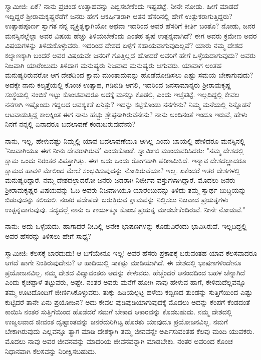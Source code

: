 ಸ್ವಾಮೀಜಿ: ಏಕೆ? ನಾನು ಪ್ರಚಂಡ ಉತ್ಸಾಹವನ್ನು ಎಬ್ಬಿಸಬೇಕೆಂದು ಇಷ್ಟಪಟ್ಟೆ. ನೀನೇ ನೋಡು. ಹೀಗೆ ಮಾಡದೆ ಇದ್ದಿದ್ದರೆ ಶ‍್ರೀರಾಮಕೃಷ್ಣರೆಡೆಗೆ ಜನರು ಹೇಗೆ ಆಕರ್ಷಿತರಾಗಿ ಆತನ ಹೆಸರಿನಲ್ಲಿ ಹೇಗೆ ಉತ್ಸುಕರಾಗುತ್ತಿದ್ದರು? ಉತ್ಸಾಹಪೂರ್ಣ ಸ್ವಾಗತ ನನ್ನ ವ್ಯಕ್ತಿತ್ವಕ್ಕಾಗಿಯೋ ಅಥವಾ ಇದರಿಂದ ಅವರ ಹೆಸರಿಗೆ ಕೀರ್ತಿ ಬಂತೊ? ನೋಡು, ಜನರ ಮನಸ್ಸಿನಲ್ಲೆಲ್ಲಾ ಅವರ ವಿಷಯ ಹೆಚ್ಚು ತಿಳಿಯಬೇಕೆಂದು ಎಂತಹ ತೃಷೆ ಉತ್ಪನ್ನವಾಗಿದೆ? ಈಗ ಅವರು ಕ್ರಮೇಣ ಅವರ ವಿಷಯಗಳನ್ನು ತಿಳಿದುಕೊಳ್ಳುವರು. ಇದರಿಂದ ದೇಶದ ಏಳ್ಗೆಗೆ ಸಹಾಯವಾಗುವುದಿಲ್ಲವೆ? ಯಾರು ನಮ್ಮ ದೇಶದ ಕಲ್ಯಾಣಕ್ಕಾಗಿ ಬಂದರೆ ಅವರ ವಿಷಯವೇ ಜನರಿಗೆ ಗೊತ್ತಿಲ್ಲದೆ ಹೋದರೆ ಅವರಿಗೆ ಹೇಗೆ ಒಳ್ಳೆಯದಾಗುವುದು? ಅವರು ನಿಜವಾಗಿ ಯಾರೆಂಬುದು ತಿಳಿದಾಗ ಮನುಷ್ಯರು ನಿಜವಾದ ಮನುಷ್ಯರು ಆಗುವರು. ಯಾವಾಗ ಅಂತಹ ಮನುಷ್ಯರಿರುವರೋ ಆಗ ದೇಶದಿಂದ ಕ್ಷಾಮ ಮುಂತಾದುವನ್ನು ಹೊಡೆದೋಡಿಸಲು ಎಷ್ಟು ಸಮಯ ಬೇಕಾಗುವುದು? ಅದಕ್ಕೇ ನಾನು ಕಲ್ಕತ್ತೆಯಲ್ಲಿ ಕೊಂಚ ಉತ್ಸಾಹ, ಗಡಿಬಿಡಿ ಆಗಲಿ, ಇದರಿಂದ ಜನಸಾಮಾನ್ಯರು ಶ‍್ರೀರಾಮಕೃಷ್ಣ ಸಂಸ್ಥೆಯಲ್ಲಿ ನಂಬಿಕೆ ಇಟ್ಟು ಕೊಂಚವಾದರೂ ಅದಕ್ಕೆ ಮನಸ್ಸು ಕೊಡಲಿ, ಎಂದು ಇಚ್ಛೆಪಟ್ಟೆ. ಇಲ್ಲದಿದ್ದಲ್ಲಿ ಕೇವಲ ನನಗಾಗಿ ಇಷ್ಟೊಂದು ಗದ್ದಲದ ಆವಶ್ಯಕತೆ ಏನಿತ್ತು? ಇದನ್ನು ಕಟ್ಟಿಕೊಂಡು ನನಗೇನು? ನಿಮ್ಮ ಮನೆಯಲ್ಲಿ ನಿನ್ನೊಡನೆ ಆಟವಾಡುತ್ತಿದ್ದ ಕಾಲಕ್ಕಿಂತ ಈಗ ನಾನು ಹೆಚ್ಚು ಶ್ರೇಷ್ಠನಾಗಿರುವೆನೇನು? ನಾನು ಅಂದಿನಂತೆ ಇಂದೂ ಇರುವೆ, ಹೇಳು ನಿನಗೆ ನನ್ನಲ್ಲಿ ಏನಾದರೂ ಬದಲಾವಣೆ ಕಂಡುಬರುವುದೇನು?

ನಾನು, ಇಲ್ಲ, ಹೇಳುವಷ್ಟು ನಿಮ್ಮಲ್ಲಿ ಯಾವ ಬದಲಾವಣೆಯೂ ಆಗಿಲ್ಲ ಎಂದು ಬಾಯಲ್ಲಿ ಹೇಳಿದರೂ ಮನಸ್ಸಿನಲ್ಲಿ 'ನಿಜವಾಗಿಯೂ ಈಗ ನೀನು ದೇವರಾಗಿರುವೆ' ಎಂದುಕೊಂಡೆ. ಸ್ವಾಮೀಜಿ ಮುಂದುವರಿಸಿದರು: "ನಮ್ಮ ದೇಶದಲ್ಲಿ ಕ್ಷಾಮ ಒಂದು ನಿರಂತರ ವಿಪತ್ತಾಗಿತ್ತು. ಈಗ ಅದು ಒಂದು ರೋಗವಾಗಿ ಪರಿಣಮಿಸಿದೆ. ಇನ್ನಾವ ದೇಶದಲ್ಲಾದರೂ ಕ್ಷಾಮದ ಹಾವಳಿ ಮೇಲಿಂದ ಮೇಲೆ ಸಂಭವಿಸುವುದನ್ನು ನೋಡಿರುವೆಯಾ? ಇಲ್ಲ. ಏಕೆಂದರೆ ಇತರ ದೇಶಗಳಲ್ಲಿ ಮನುಷ್ಯರಿದ್ದಾರೆ. ನಮ್ಮ ದೇಶದಲ್ಲಾದರೋ ಜನರು ಜಡರಾಗಿ ನಿರ್ಜೀವ ವಸ್ತುಗಳಾಗಿದ್ದಾರೆ. ಮೊದಲು ಜನರು ಶ‍್ರೀರಾಮಕೃಷ್ಣರ ವಿಷಯವನ್ನು ಓದಿ ಅವರು ನಿಜವಾಗಿಯೂ ಯಾರೆಂಬುದನ್ನು ತಿಳಿದು ತಮ್ಮ ಸ್ವಾರ್ಥ ಬುದ್ಧಿಯನ್ನು ಬಿಡುವುದನ್ನು ಕಲಿಯಲಿ. ನಂತರ ಪದೇಪದೇ ಬರುತ್ತಿರುವ ಕ್ಷಾಮವನ್ನು ನಿಲ್ಲಿಸಲು ನಿಜವಾದ ಪ್ರಯತ್ನಗಳು ಉತ್ಪನ್ನವಾಗುವುವು. ಸದ್ಯದಲ್ಲೆ ನಾನು ಆ ಕಾರ್ಯಕ್ಕೂ ಕೊಂಚ ಪ್ರಯತ್ನ ಮಾಡಬೇಕೆಂದಿರುವೆ. ನೀನೇ ನೋಡುವೆ."

ನಾನು: ಅದು ಒಳ್ಳೆಯದು. ಹಾಗಾದರೆ ನೀವಿಲ್ಲಿ ಅನೇಕ ಭಾಷಣಗಳನ್ನು ಕೊಡುವಿರೆಂದು ಭಾವಿಸಿರುವೆ. ಇಲ್ಲದಿದ್ದಲ್ಲಿ ಅವರ ಹೆಸರನ್ನು ತಿಳಿಸಲು ಹೇಗೆ ಸಾಧ್ಯ?

ಸ್ವಾಮೀಜಿ: ಕೆಲಸಕ್ಕೆ ಬಾರದುದು! ಆ ಬಗೆಯೇನೂ ಇಲ್ಲ! ಅವರ ಹೆಸರು ಪ್ರಕಾಶಕ್ಕೆ ಬರುವಂತಹ ಯಾವ ಕೆಲಸವಾದರೂ ಆಗದೆ ಹಾಗೇ ನಿಂತಿರುವುದೇನು? ಆ ಹಾದಿಯಲ್ಲಿ ಸಾಕಷ್ಟು ಮಾಡಿಯಾಗಿದೆ. ಈ ದೇಶದಲ್ಲಿ ಭಾಷಣಗಳಿಂದೇನೂ ಪ್ರಯೋಜನವಿಲ್ಲ. ನಮ್ಮ ದೇಶದ ವಿದ್ಯಾವಂತರು ಅದನ್ನು ಕೇಳುವರು. ಹೆಚ್ಚೆಂದರೆ ಆನಂದದಿಂದ ಬಹಳ ಚೆನ್ನಾಗಿದೆ ಎಂದು ಕೈಚಪ್ಪಾಳೆ ತಟ್ಟುವರು, ಅಷ್ಟೇ. ನಂತರ ಅವರು ಮನೆಗೆ ಹೋಗಿ ನಾವು ಹೇಳುವ ಹಾಗೆ, ಕೇಳಿದುದೆಲ್ಲವನ್ನೂ ತಮ್ಮ ಊಟದೊಂದಿಗೆ ಜೀರ್ಣಿಸಿಕೊಳ್ಳುವರು. ತುಕ್ಕು ಹಿಡಿಯಲ್ಪಟ್ಟ ಹಳೆಯ ಕಬ್ಬಿಣದ ತುಂಡನ್ನು ಸುತ್ತಿಗೆಯಿಂದ ಎಷ್ಟು ಕುಟ್ಟಿದರೆ ತಾನೇ ಏನು ಪ್ರಯೋಜನ? ಅದು ಕೇವಲ ಪುಡಿಪುಡಿಯಾಗುವುದಕ್ಕೆ ಮೊದಲು ಅದನ್ನು ಕೆಂಪಗೆ ಕೆಂಡದಂತೆ ಕಾಯಿಸಿ ನಂತರ ಸುತ್ತಿಗೆಯಿಂದ ಹೊಡೆದರೆ ನಮಗೆ ಬೇಕಾದ ಆಕಾರವನ್ನು ಕೊಡಬಹುದು. ನಮ್ಮ ದೇಶದಲ್ಲಿ ಉಜ್ವಲವಾದ ಜೀವಂತ ದೃಷ್ಟಾಂತವನ್ನು ಜನರೆದುರಿಗಿಟ್ಟ ಹೊರತು ಯಾವುದೂ ಪ್ರಯೋಜನವಿಲ್ಲ. ನಮಗೆ ಬೇಕಾಗಿರುವುದು ಎಲ್ಲವನ್ನೂ ತ್ಯಾಗ ಮಾಡಿ ದೇಶಕ್ಕಾಗಿ ತಮ್ಮ ಜೀವವನ್ನೇ ಅರ್ಪಿಸುವಂತಹ ಕೆಲವು ಮಂದಿ ಯುವಕರು. ಮೊದಲು ನಾವು ಅವರ ಜೀವನವನ್ನು ಮಾದರಿಯ ಜೀವನವನ್ನಾಗಿ ಮಾಡಬೇಕು. ನಂತರ ಅವರಿಂದ ಕೊಂಚ ನಿಧಾನವಾಗಿ ಕೆಲಸವನ್ನು ನಿರೀಕ್ಷಿಸಬಹುದು.

